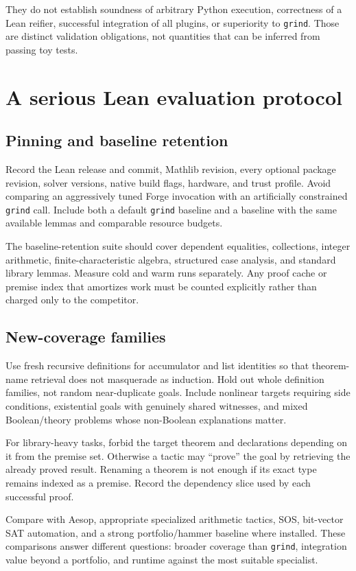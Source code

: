 \documentclass[11pt,letterpaper]{article}
\newcommand{\grind}{\texttt{grind}}
\theoremstyle{definition}\newtheorem{definition}[proposition]{Definition}
\begin{document}
They do not establish soundness of arbitrary Python execution, correctness of a Lean reifier, successful integration of all plugins, or superiority to \grind{}. Those are distinct validation obligations, not quantities that can be inferred from passing toy tests.

\section{A serious Lean evaluation protocol}
\label{sec:evaluation}
\subsection{Pinning and baseline retention}
Record the Lean release and commit, Mathlib revision, every optional package revision, solver versions, native build flags, hardware, and trust profile. Avoid comparing an aggressively tuned Forge invocation with an artificially constrained \grind{} call. Include both a default \grind{} baseline and a baseline with the same available lemmas and comparable resource budgets.

The baseline-retention suite should cover dependent equalities, collections, integer arithmetic, finite-characteristic algebra, structured case analysis, and standard library lemmas. Measure cold and warm runs separately. Any proof cache or premise index that amortizes work must be counted explicitly rather than charged only to the competitor.

\subsection{New-coverage families}
Use fresh recursive definitions for accumulator and list identities so that theorem-name retrieval does not masquerade as induction. Hold out whole definition families, not random near-duplicate goals. Include nonlinear targets requiring side conditions, existential goals with genuinely shared witnesses, and mixed Boolean/theory problems whose non-Boolean explanations matter.

For library-heavy tasks, forbid the target theorem and declarations depending on it from the premise set. Otherwise a tactic may ``prove'' the goal by retrieving the already proved result. Renaming a theorem is not enough if its exact type remains indexed as a premise. Record the dependency slice used by each successful proof.

Compare with Aesop, appropriate specialized arithmetic tactics, SOS, bit-vector SAT automation, and a strong portfolio/hammer baseline where installed. These comparisons answer different questions: broader coverage than \grind{}, integration value beyond a portfolio, and runtime against the most suitable specialist.
\end{document}
